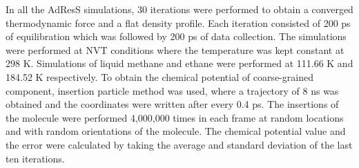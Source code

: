 \documentclass[a4paper,preprint,unsortedaddress]{revtex4-1}
\begin{document}
In all the AdResS simulations, 30 iterations were performed to obtain a 
converged thermodynamic force and a flat density profile. Each iteration consisted 
of 200 ps of equilibration which was followed by 200 ps of data collection. 
The simulations were performed at NVT conditions where the temperature was kept constant 
at 298 K. Simulations of liquid methane and ethane were performed at
111.66 K and 184.52 K respectively. To obtain the chemical potential of coarse-grained component, 
insertion particle method was used, where a trajectory of 8 ns was obtained and the coordinates were written
after every 0.4 ps. The insertions of the molecule were performed 4,000,000 times in each 
frame at random locations and with random orientations of the molecule. The chemical potential value and
the error were calculated by taking the average and standard deviation of the last ten iterations. 
\end{document}
